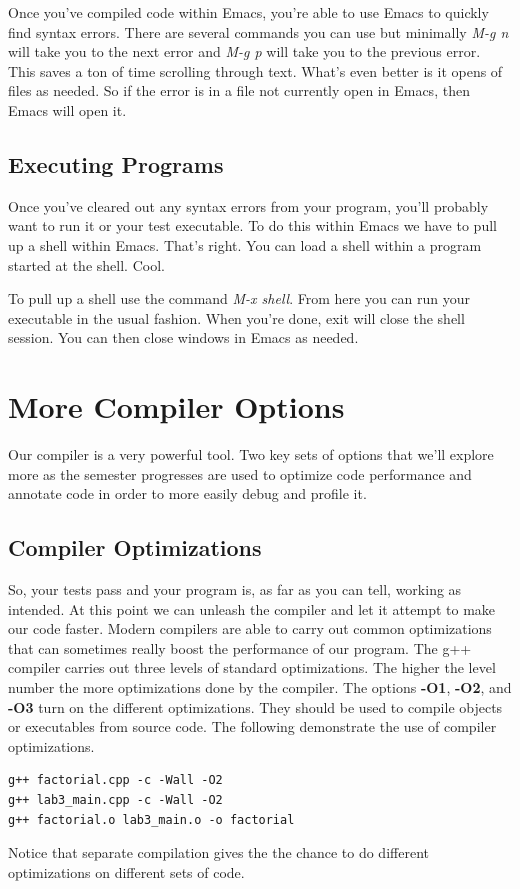 \documentclass[]{tufte-handout}
\begin{document}
Once you've compiled code within Emacs, you're able to use Emacs to quickly find syntax errors.  There are several commands you can use but minimally \textit{M-g n} will take you to the next error and \textit{M-g p} will take you to the previous error.  This saves a ton of time scrolling through text. What's even better is it opens of files as needed. So if the error is in a file not currently open in Emacs, then Emacs will open it. 

\subsection{Executing Programs}

Once you've cleared out any syntax errors from your program, you'll probably want to run it or your test executable. To do this within Emacs we have to pull up a shell within Emacs. That's right. You can load a shell within a program started at the shell.  Cool. 

To pull up a shell use the command \textit{M-x shell}. From here you can run your executable in the usual fashion. When you're done, exit will close the shell session.  You can then close windows in Emacs as needed.


\section{More Compiler Options}

Our compiler is a very powerful tool. Two key sets of options that we'll explore more as the semester progresses are used to optimize code performance and annotate code in order to more easily debug and profile it. 
 
\subsection{Compiler Optimizations}

So, your tests pass and your program is, as far as you can tell, working as intended.  At this point we can unleash the compiler and let it attempt to make our code faster. Modern compilers are able to carry out common optimizations that can sometimes really boost the performance of our program. The g++ compiler carries out three levels of standard optimizations.  The higher the level number the more optimizations done by the compiler. The options \textbf{-O1}, \textbf{-O2}, and \textbf{-O3} turn on the different optimizations. They should be used to compile objects or executables from source code. The following demonstrate the use of compiler optimizations.
\begin{verbatim}
g++ factorial.cpp -c -Wall -O2 
g++ lab3_main.cpp -c -Wall -O2 
g++ factorial.o lab3_main.o -o factorial
\end{verbatim}
Notice that separate compilation gives the the chance to do different optimizations on different sets of code.  
\end{document}
